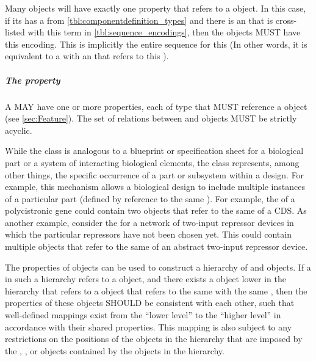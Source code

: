 Many  objects will have exactly one  property that refers to a  object.  In this case, if its has a  from \ref{tbl:componentdefinition_types} and there is an  that is cross-listed with this term in \ref{tbl:sequence_encodings}, then the  objects MUST have this encoding.
This  is implicitly the entire sequence for this  (In other words, it is equivalent to a  with an   that refers to this ).

\subparagraph{The  property}
\label{sec:hasFeature}

A  MAY have one or more  properties, each of type  that MUST reference a  object (see \ref{sec:Feature}). The set of relations between  and  objects MUST be strictly acyclic.

While the  class is analogous to a blueprint or specification sheet for a biological part or a system of interacting biological elements, the  class represents, among other things, the specific occurrence of a part or subsystem within a design.  For example, this mechanism allows a biological design to include multiple instances of a particular part (defined by reference to the same ). For example, the  of a polycistronic gene could contain two  objects that refer to the same  of a CDS.  As another example, consider the  for a network of two-input repressor devices in which the particular repressors have not been chosen yet. This  could contain multiple  objects that refer to the same  of an abstract two-input repressor device.

The  properties of  objects can be used to construct a hierarchy of  and  objects.  If a  in such a hierarchy refers to a  object, and there exists a  object lower in the hierarchy that refers to a  object that refers to the same  with the same , then the  properties of these  objects SHOULD be consistent with each other, such that well-defined mappings exist from the ``lower level''  to the ``higher level''  in accordance with their shared  properties. This mapping is also subject to any restrictions on the positions of the  objects in the hierarchy that are imposed by the , , or  objects contained by the  objects in the hierarchy.

